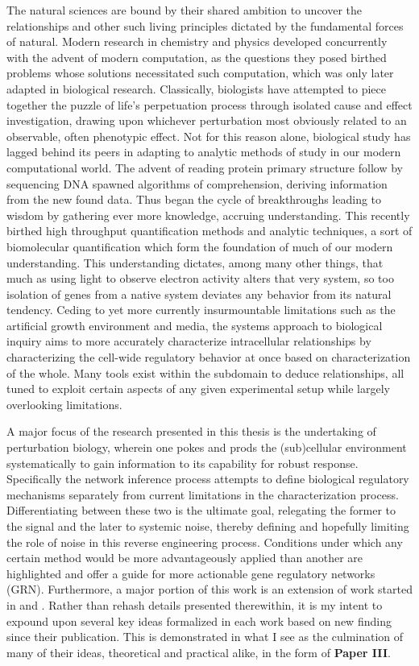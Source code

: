 The natural sciences are bound by their shared ambition to uncover the relationships and other such living principles dictated by the fundamental forces of natural. Modern research in chemistry and physics developed concurrently with the advent of modern computation, as the questions they posed birthed problems whose solutions necessitated such computation, which was only later adapted in biological research. Classically, biologists have attempted to piece together the puzzle of life's perpetuation process through isolated cause and effect investigation, drawing upon whichever perturbation most obviously related to an observable, often phenotypic effect. Not for this reason alone, biological study has lagged behind its peers in adapting to analytic methods of study in our modern computational world. The advent of reading protein primary structure follow by sequencing DNA spawned algorithms of comprehension, deriving information from the new found data. Thus began the cycle of breakthroughs leading to wisdom by gathering ever more knowledge, \ie accruing understanding. This recently birthed high throughput quantification methods and analytic techniques, a sort of biomolecular quantification which form the foundation of much of our modern understanding. This understanding dictates, among many other things, that much as using light to observe electron activity alters that very system, so too isolation of genes from a native system deviates any behavior from its natural tendency. Ceding to yet more currently insurmountable limitations such as the artificial growth environment and media, the systems approach to biological inquiry aims to more accurately characterize intracellular relationships by characterizing the cell-wide regulatory behavior at once based on characterization of the whole. Many tools exist within the subdomain to deduce relationships, all tuned to exploit certain aspects of any given experimental setup while largely overlooking limitations.

A major focus of the research presented in this thesis is the undertaking of perturbation biology, wherein one pokes and prods the (sub)cellular environment systematically to gain information to its capability for robust response. Specifically the network inference process attempts to define biological regulatory mechanisms separately from current limitations in the characterization process. Differentiating between these two is the ultimate goal, relegating the former to the signal and the later to systemic noise, thereby defining and hopefully limiting the role of noise in this reverse engineering process. Conditions under which any certain method would be more advantageously applied than another are highlighted and offer a guide for more actionable gene regulatory networks (GRN). Furthermore, a major portion of this work is an extension of work started in \cite{Nordling2013} and \cite{Tjarnberg2015etb}. Rather than rehash details presented therewithin, it is my intent to expound upon several key ideas formalized in each work based on new finding since their publication. This is demonstrated in what I see as the culmination of many of their ideas, theoretical and practical alike, in the form of \textbf{Paper III}.

